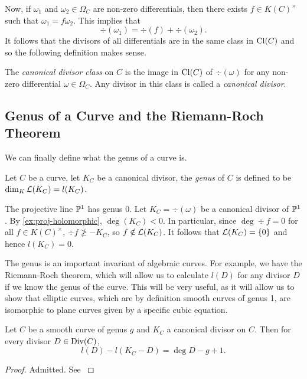 Now, if $\omega_1$ and $\omega_2 \in \Omega_C$ are non-zero differentials, then
there exists $f\in K(C)^\times$ such that $\omega_1 = f\omega_2$.
This implies that
\begin{equation*}
	\div(\omega_1) = \div(f) + \div(\omega_2).
\end{equation*}
It follows that the divisors of all differentials are in the same class in
$\operatorname{Cl}(C)$ and so the following definition makes sense.

\begin{definition}
	The \emph{canonical divisor class} on $C$ is the image in $\operatorname{Cl}(C)$ of
	$\div(\omega)$ for any non-zero differential $\omega \in \Omega_C$.
	Any divisor in this class is called a \emph{canonical divisor}.
\end{definition}

\subsection{Genus of a Curve and the Riemann-Roch Theorem}

We can finally define what the genus of a curve is.
\begin{definition}
	Let $C$ be a curve, let $K_C$ be a canonical divisor,
	the \emph{genus} of $C$ is defined to be $\dim_K \mathcal{L}(K_C) = l(K_C)$.
\end{definition}

\begin{example}
	\label{ex:proj-genus}
	The projective line $\mathbb{P}^1$ has genus 0.
	Let $K_C = \div(\omega)$ be a canonical divisor of $\mathbb{P}^1$.
	By \ref{ex:proj-holomorphic}, $\deg(K_C) < 0$. In particular, 
	since $\deg \div f = 0$ for all $f \in K(C)^\times$,
	$\div f \not\geq -K_C$,
	so $f \notin \mathcal{L}(K_C)$. It follows that $\mathcal{L}(K_C) = \{0\}$ and
	hence $l(K_C) = 0$.
\end{example}

The genus is an important invariant  of algebraic curves.
For example, we have the Riemann-Roch theorem, which will
allow us to calculate $l(D)$ for any divisor $D$ if we know the genus of
the curve.
This will be very useful, as it will allow us to show that elliptic curves,
which are by definition smooth curves of genus 1, are
isomorphic to plane curves given by a specific cubic equation.
\begin{theorem}
	\label{thm:riemann-roch}
	Let $C$ be a smooth curve of genus $g$ and $K_C$ a canonical divisor on $C$.
	Then for every divisor $D \in \operatorname{Div}(C)$,
	\begin{equation*}
		l(D) - l(K_C - D) = \deg D - g + 1.
	\end{equation*}
\end{theorem}
\begin{proof}
	Admitted. See \cite[IV.1.3]{hartshorne}
\end{proof}

